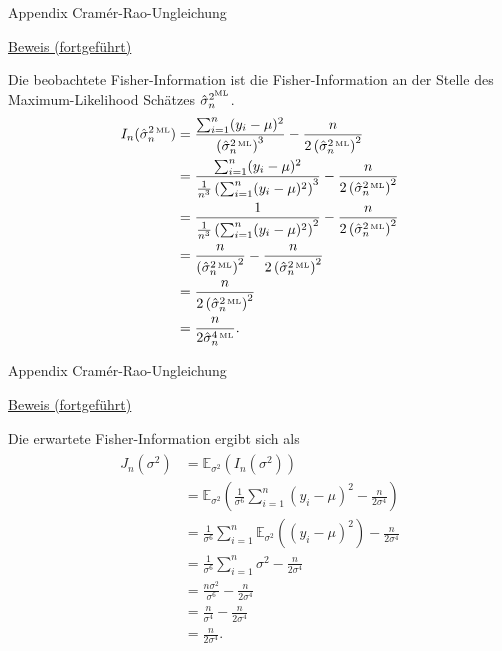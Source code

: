 \documentclass[
  8pt,
  ignorenonframetext,
]{beamer}
\begin{document}
\begin{frame}{Appendix \textbar{} Cramér-Rao-Ungleichung}
\protect\hypertarget{appendix-cramuxe9r-rao-ungleichung-15}{}
\footnotesize

\underline{Beweis (fortgeführt)}

Die beobachtete Fisher-Information ist die Fisher-Information an der
Stelle des Maximum-Likelihood Schätzes
\(\hat{\sigma}^{2^{\mbox{\tiny ML}}}_n\). \begin{align}
\begin{split}
I_n(\hat{\sigma}^{2\,\mbox{\tiny ML}}_n)
& =   \frac{\sum_{i=1}^n (y_i - \mu)^2}{\left(\hat{\sigma}^{2\,\mbox{\tiny ML}}_n \right)^3}
    - \frac{n}{2\left(\hat{\sigma}^{2\,\mbox{\tiny ML}}_n \right)^2}                                    \\
& =   \frac{\sum_{i=1}^n (y_i - \mu)^2}{\frac{1}{n^3}\left(\sum_{i=1}^n (y_i - \mu)^2 \right)^3}
    - \frac{n}{2\left(\hat{\sigma}^{2\,\mbox{\tiny ML}}_n \right)^2}                                    \\
& =   \frac{1}{\frac{1}{n^3}\left(\sum_{i=1}^n (y_i - \mu)^2 \right)^2}
    - \frac{n}{2\left(\hat{\sigma}^{2\,\mbox{\tiny ML}}_n \right)^2}                                    \\
& =   \frac{n}{\left(\hat{\sigma}^{2\,\mbox{\tiny ML}}_n \right)^2}
    - \frac{n}{2\left(\hat{\sigma}^{2\,\mbox{\tiny ML}}_n \right)^2}                                \\
& =  \frac{n}{2\left(\hat{\sigma}^{2\,\mbox{\tiny ML}}_n \right)^2}                                     \\
& =  \frac{n}{2\hat{\sigma}^{4\,\mbox{\tiny ML}}_n}.
\end{split}
\end{align}
\end{frame}

\begin{frame}{Appendix \textbar{} Cramér-Rao-Ungleichung}
\protect\hypertarget{appendix-cramuxe9r-rao-ungleichung-16}{}
\footnotesize

\underline{Beweis (fortgeführt)}

\footnotesize

Die erwartete Fisher-Information ergibt sich als \begin{align}
\begin{split}
J_n(\sigma^2)
& = \mathbb{E}_{\sigma^2}(I_n(\sigma^2))    \\
& = \mathbb{E}_{\sigma^2}\left(\frac{1}{\sigma^6}\sum_{i=1}^n (y_i - \mu)^2
  - \frac{n}{2\sigma^4}\right)  \\
& = \frac{1}{\sigma^6}\sum_{i=1}^n \mathbb{E}_{\sigma^2}\left((y_i - \mu)^2 \right)
  - \frac{n}{2\sigma^4} \\
& = \frac{1}{\sigma^6}\sum_{i=1}^n \sigma^2 - \frac{n}{2\sigma^4}   \\
& = \frac{n\sigma^2}{\sigma^6} - \frac{n}{2\sigma^4}    \\
& = \frac{n}{\sigma^4} - \frac{n}{2\sigma^4}    \\
& = \frac{n}{2\sigma^4}.    \\
\end{split}
\end{align}
\end{frame}
\end{document}
